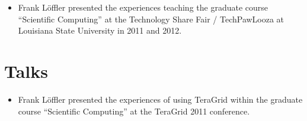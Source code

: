\documentclass[11pt]{article}
\begin{document}
\begin{itemize}
 \item Frank Löffler presented the experiences teaching the graduate course ``Scientific Computing'' at the Technology Share Fair / TechPawLooza at Louisiana State University in 2011 and 2012.
\end{itemize}

\section{Talks}
\begin{itemize}
 \item Frank Löffler presented the experiences of using TeraGrid within the graduate course ``Scientific Computing'' at the TeraGrid 2011 conference.
\end{itemize}
\end{document}
